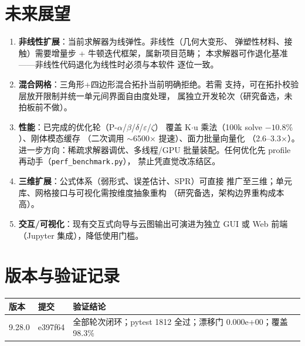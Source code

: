 \documentclass[12pt,a4paper]{ctexart}
\newcommand{\fem}{\Verb}
\begin{document}
\section{未来展望}

\begin{enumerate}[leftmargin=*]
  \item \textbf{非线性扩展}：当前求解器为线弹性。非线性（几何大变形、
        弹塑性材料、接触）需要增量步 + 牛顿迭代框架，属新项目范畴；
        本求解器可作退化基准——非线性代码退化为线性时必须与本软件
        逐位一致。

  \item \textbf{混合网格}：三角形+四边形混合拓扑当前明确拒绝。若需
        支持，可在拓扑校验层放开限制并统一单元间界面自由度处理，
        属独立开发轮次（研究备选，未拍板前不做）。

  \item \textbf{性能}：已完成的优化轮（P-$\alpha$/$\beta$/$\delta$/$\varepsilon$/$\zeta$）
        覆盖 K$\cdot$u 乘法（100k solve $-10.8\%$）、刚体模态缓存
        （二次调用 $\sim$6500$\times$ 提速）、面力批量向量化
        （2.6--3.3$\times$）。进一步方向：稀疏求解器调优、多线程/GPU
        批量装配。任何优化先 profile 再动手（\fem|perf_benchmark.py|），
        禁止凭直觉改冻结区。

  \item \textbf{三维扩展}：公式体系（弱形式、误差估计、SPR）可直接
        推广至三维；单元库、网格接口与可视化需按维度抽象重构
        （研究备选，架构边界重构成本高）。

  \item \textbf{交互/可视化}：现有交互式向导与云图输出可演进为独立
        GUI 或 Web 前端（Jupyter 集成），降低使用门槛。
\end{enumerate}

\section{版本与验证记录}

\begin{longtable}{p{2.3cm}p{3.7cm}p{8.6cm}}
\toprule
版本 & 提交 & 验证结论 \\
\midrule
9.28.0 & e397f64 & 全部轮次闭环；pytest 1812 全过；漂移门 0.000e+00；覆盖 98.3\% \\
\bottomrule
\end{longtable}
\end{document}
